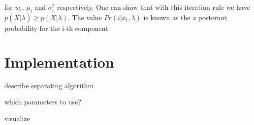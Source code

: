 for $w_i$, $\mu_i$ and $\sigma_i^2$ respectively. One can show that with this iteration rule we have $p(X|\bar{\lambda}) \geq p(X|\lambda)$. The value $Pr(i|x_t, \lambda)$ is known as the a posteriori probability for the i-th component.



\section{Implementation}
describe separating algorithm

which parameters to use?

visualize
